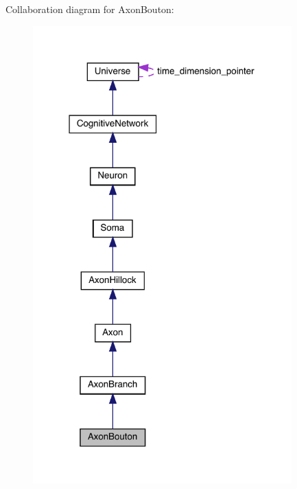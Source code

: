 Collaboration diagram for Axon\+Bouton\+:\nopagebreak
\begin{figure}[H]
\begin{center}
\leavevmode
\includegraphics[width=283pt]{class_axon_bouton__coll__graph}
\end{center}
\end{figure}
